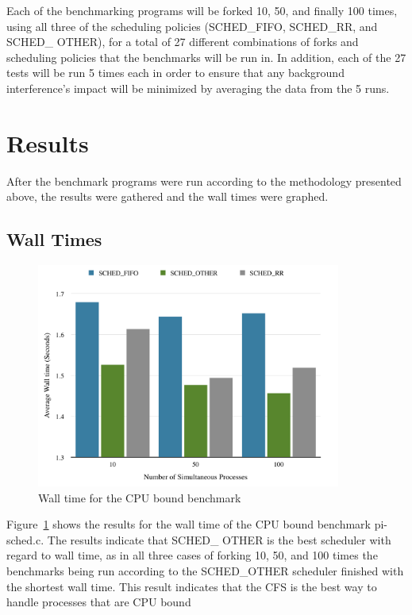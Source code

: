 \documentclass[12pt]{article}
\begin{document}
Each of the benchmarking programs will be forked 10, 50, and finally 100 times, 
using all three of the scheduling policies (SCHED\_FIFO, SCHED\_RR, and SCHED\_
OTHER), for a total of 27 different combinations of forks and scheduling 
policies that the benchmarks will be run in. In addition, each of the 27 tests
will be run 5 times each in order to ensure that any background interference's
impact will be minimized by averaging the data from the 5 runs.

\newpage

\section{Results}

After the benchmark programs were run according to the methodology presented 
above, the results were gathered and the wall times were graphed. 

\subsection{Wall Times}
\begin{figure}[!htb]
  \begin{center}
    \includegraphics[width=100mm]{CPUWall.png}
    \caption{Wall time for the CPU bound benchmark}
    \label{fig:cpuwall}
  \end{center} 
\end{figure}

Figure~\ref{fig:cpuwall} shows the results for the wall time of the CPU bound
benchmark {\ttfamily pi-sched.c}. The results indicate that {\ttfamily SCHED\_
OTHER} is the best scheduler with regard to wall time, as in all three cases
of forking 10, 50, and 100 times the benchmarks being run according to the 
{\ttfamily SCHED\_OTHER} scheduler finished with the shortest wall time. This 
result indicates that the CFS is the best way to handle processes that are CPU
bound
\end{document}
